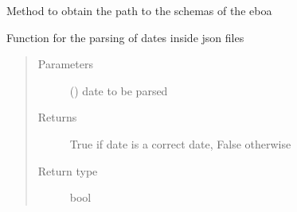 \begin{fulllineitems}
\label{\detokenize{eboa.engine:eboa.engine.functions.get_schemas_path}}
Method to obtain the path to the schemas of the eboa

\end{fulllineitems}


\begin{fulllineitems}
\label{\detokenize{eboa.engine:eboa.engine.functions.is_datetime}}
Function for the parsing of dates inside json files
\begin{quote}\begin{description}
\item[{Parameters}] \leavevmode
{} () \textendash{} date to be parsed

\item[{Returns}] \leavevmode
True if date is a correct date, False otherwise

\item[{Return type}] \leavevmode
bool

\end{description}\end{quote}

\end{fulllineitems}


\begin{fulllineitems}
\label{\detokenize{eboa.engine:eboa.engine.functions.is_valid_bool_filter}}
\end{fulllineitems}


